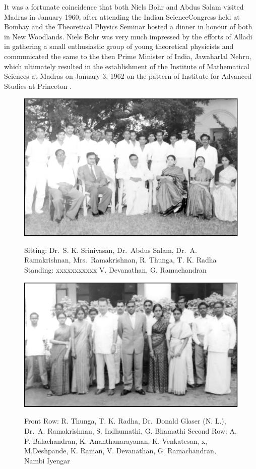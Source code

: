 It was a fortunate coincidence that both Niels Bohr and Abdus Salam visited Madras in January 1960, after attending the Indian Science\break Congress held at Bombay and the Theoretical Physics Seminar hosted a dinner in honour of both in New Woodlands. Niels Bohr was very much impressed by the efforts of Alladi in gathering a small enthusiastic group of young theoretical physicists and communicated the same to the then Prime Minister of India, Jawaharlal Nehru, which ultimately resulted in the establishment of the Institute of Mathematical Sciences at Madras 	on January 3, 1962 on the pattern of Institute for Advanced Studies at Princeton \cite{chap3-key9}.
\medskip

\begin{figure}[H]
\centering
\includegraphics[scale=.32]{src/images/chap3/chap3-fig1.eps}\\
\caption{Sitting: Dr.\ S. K. Srinivasan, Dr.\ Abdus Salam, Dr.\ A. Ramakrishnan, Mrs.\ Ramakrishnan, R. Thunga, T. K. Radha
Standing: xxxxxxxxxxx V. Devanathan, G. Ramachandran}
\end{figure}
\medskip

\begin{figure}[H]
\centering
\includegraphics[scale=.32]{src/images/chap3/chap3-fig2.eps}\\
\caption{Front Row: R. Thunga, T. K. Radha, Dr.\ Donald Glaser (N. L.), Dr.\ A. Ramakrishnan, S. Indhumathi, G. Bhamathi
Second Row: A. P. Balachandran, K. Ananthanarayanan, K. Venkatesan, x, M.Deshpande, K. Raman, V. Devanathan, G. Ramachandran, Nambi Iyengar}
\end{figure}

